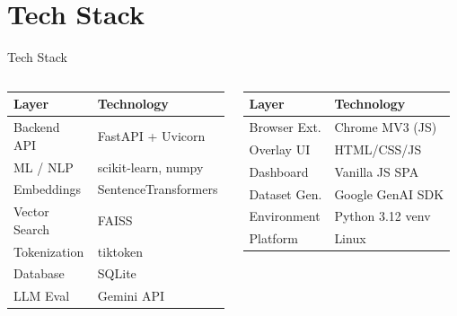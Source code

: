 \documentclass[aspectratio=169]{beamer}
\begin{document}
\section{Tech Stack}
\begin{frame}{Tech Stack}
  \begin{columns}
    \begin{tabular}{ll}
      \textbf{Layer} & \textbf{Technology} \\
      \midrule
      Backend API    & FastAPI + Uvicorn \\
      ML / NLP       & scikit-learn, numpy \\
      Embeddings     & SentenceTransformers \\
      Vector Search  & FAISS \\
      Tokenization   & tiktoken \\
      Database       & SQLite \\
      LLM Eval       & Gemini API \\
    \end{tabular}
    \begin{tabular}{ll}
      \textbf{Layer} & \textbf{Technology} \\
      \midrule
      Browser Ext.   & Chrome MV3 (JS) \\
      Overlay UI     & HTML/CSS/JS \\
      Dashboard      & Vanilla JS SPA \\
      Dataset Gen.   & Google GenAI SDK \\
      Environment    & Python 3.12 venv \\
      Platform       & Linux \\
    \end{tabular}
  \end{columns}
\end{frame}

\end{document}
